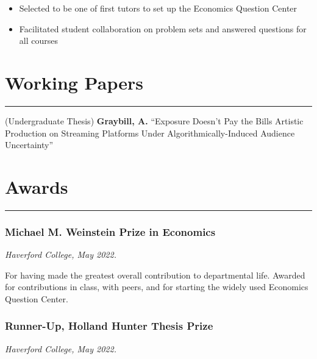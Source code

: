 \documentclass[
  letterpaper,
  DIV=11,
  numbers=noendperiod]{scrartcl}
\providecommand{\tightlist}{%
  \setlength{\itemsep}{0pt}\setlength{\parskip}{0pt}}\usepackage{longtable,booktabs,array}
\let\oldrule=\rule
\renewcommand{\rule}[1]{\oldrule{\linewidth}}
\begin{document}
\begin{itemize}
\tightlist
\item
  Selected to be one of first tutors to set up the Economics Question
  Center
\item
  Facilitated student collaboration on problem sets and answered
  questions for all courses
\end{itemize}

\hypertarget{working-papers}{%
\section{Working Papers}\label{working-papers}}

\begin{center}\rule{0.5\linewidth}{0.5pt}\end{center}

(Undergraduate Thesis) \textbf{Graybill, A.} ``Exposure Doesn't Pay the
Bills Artistic Production on Streaming Platforms Under
Algorithmically-Induced Audience Uncertainty''

\newpage

\hypertarget{awards}{%
\section{Awards}\label{awards}}

\begin{center}\rule{0.5\linewidth}{0.5pt}\end{center}

\hypertarget{michael-m.-weinstein-prize-in-economics}{%
\subsubsection{Michael M. Weinstein Prize in
Economics}\label{michael-m.-weinstein-prize-in-economics}}

\emph{Haverford College, May 2022.}

For having made the greatest overall contribution to departmental life.
Awarded for contributions in class, with peers, and for starting the
widely used Economics Question Center.

\hypertarget{runner-up-holland-hunter-thesis-prize}{%
\subsubsection{Runner-Up, Holland Hunter Thesis
Prize}\label{runner-up-holland-hunter-thesis-prize}}

\emph{Haverford College, May 2022.}
\end{document}
